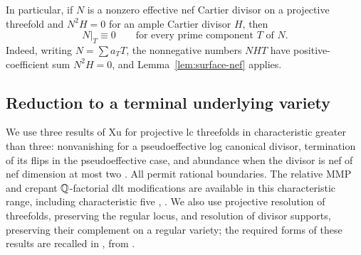 In particular, if $N$ is a nonzero effective nef Cartier divisor on a
projective threefold and $N^2H=0$ for an ample Cartier divisor $H$, then
\begin{equation}\label{eq:restriction-zero}
N|_T\equiv0\qquad\text{for every prime component }T\text{ of }N.
\end{equation}
Indeed, writing $N=\sum a_TT$, the nonnegative numbers $NHT$ have
positive-coefficient sum $N^2H=0$, and Lemma~\ref{lem:surface-nef} applies.

\subsection{Reduction to a terminal underlying variety}

We use three results of Xu for projective lc threefolds in characteristic
greater than three: nonvanishing for a pseudoeffective log canonical
divisor, termination of its flips in the pseudoeffective case, and
abundance when the divisor is nef of nef dimension at most two
\cite[Theorems~1.4, 1.5, and~1.8]{XuNonvanishing}. All permit rational
boundaries. The relative MMP and crepant $\mathbb Q$-factorial dlt modifications
are available in this characteristic range, including characteristic
five \cite[Theorem~1.2]{HW}, \cite[Theorems~2.20 and~2.27]{XuNuTwo}.
We also use projective resolution of threefolds, preserving the regular
locus, and resolution of divisor supports, preserving their complement
on a regular variety; the required forms of
these results are recalled in \cite[Section~2.1]{Companion}, from
\cite{CPFirst,CP,CJS}.


